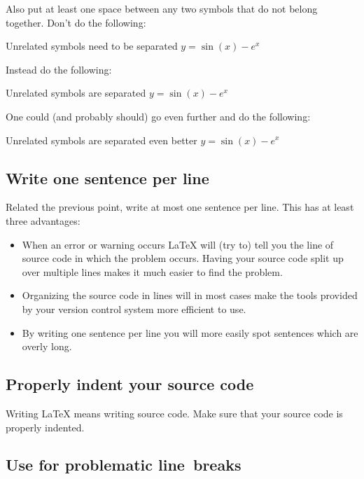 Also put at least one space between any two symbols that do not belong together.
Don’t do the following:
\begin{showcode}{Unrelated symbols need to be separated}
$y=\sin(x)-e^x$
\end{showcode}
Instead do the following:
\begin{showcode}{Unrelated symbols are separated}
$y = \sin(x) - e^x$
\end{showcode}
One could (and probably should) go even further and do the following:
\begin{showcode}{Unrelated symbols are separated even better}
$y = \sin ( x ) - e^x$
\end{showcode}



\subsection{Write one sentence per line}

Related the previous point, write at most one sentence per line.
This has at least three advantages:
\begin{itemize}
  \item
    When an error or warning occurs {\LaTeX} will (try to) tell you the line of source code in which the problem occurs.
    Having your source code split up over multiple lines makes it much easier to find the problem.
  \item
    Organizing the source code in lines will in most cases make the tools provided by your version control system more efficient to use.
  \item
    By writing one sentence per line you will more easily spot sentences which are overly long.
\end{itemize}



\subsection{Properly indent your source code}

Writing {\LaTeX} means writing source code.
Make sure that your source code is properly indented.



\subsection{Use \inlinecodetitle{\%} for problematic line~breaks}

